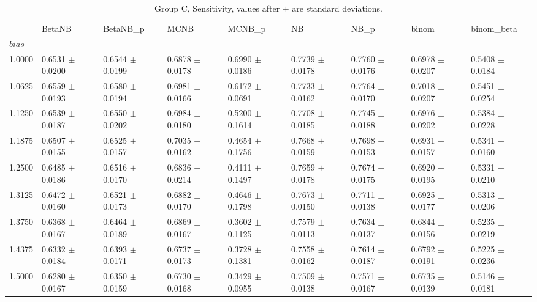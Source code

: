 \begin{table}[H]
\centering
\begin{adjustbox}{max width=\linewidth}
\begin{tabular}{lllllllll}
\toprule
 & BetaNB & BetaNB\_p & MCNB & MCNB\_p & NB & NB\_p & binom & binom\_beta \\
$bias$ &  &  &  &  &  &  &  &  \\
\midrule
1.0000 & 0.6531 $\pm$ 0.0200 & 0.6544 $\pm$ 0.0199 & 0.6878 $\pm$ 0.0178 & 0.6990 $\pm$ 0.0186 & 0.7739 $\pm$ 0.0178 & 0.7760 $\pm$ 0.0176 & 0.6978 $\pm$ 0.0207 & 0.5408 $\pm$ 0.0184 \\
1.0625 & 0.6559 $\pm$ 0.0193 & 0.6580 $\pm$ 0.0194 & 0.6981 $\pm$ 0.0166 & 0.6172 $\pm$ 0.0691 & 0.7733 $\pm$ 0.0162 & 0.7764 $\pm$ 0.0170 & 0.7018 $\pm$ 0.0207 & 0.5451 $\pm$ 0.0254 \\
1.1250 & 0.6539 $\pm$ 0.0187 & 0.6550 $\pm$ 0.0202 & 0.6984 $\pm$ 0.0180 & 0.5200 $\pm$ 0.1614 & 0.7708 $\pm$ 0.0185 & 0.7745 $\pm$ 0.0188 & 0.6976 $\pm$ 0.0202 & 0.5384 $\pm$ 0.0228 \\
1.1875 & 0.6507 $\pm$ 0.0155 & 0.6525 $\pm$ 0.0157 & 0.7035 $\pm$ 0.0162 & 0.4654 $\pm$ 0.1756 & 0.7668 $\pm$ 0.0159 & 0.7698 $\pm$ 0.0153 & 0.6931 $\pm$ 0.0157 & 0.5341 $\pm$ 0.0160 \\
1.2500 & 0.6485 $\pm$ 0.0186 & 0.6516 $\pm$ 0.0170 & 0.6836 $\pm$ 0.0214 & 0.4111 $\pm$ 0.1497 & 0.7659 $\pm$ 0.0178 & 0.7674 $\pm$ 0.0175 & 0.6920 $\pm$ 0.0195 & 0.5331 $\pm$ 0.0210 \\
1.3125 & 0.6472 $\pm$ 0.0160 & 0.6521 $\pm$ 0.0173 & 0.6882 $\pm$ 0.0170 & 0.4646 $\pm$ 0.1798 & 0.7673 $\pm$ 0.0150 & 0.7711 $\pm$ 0.0138 & 0.6925 $\pm$ 0.0177 & 0.5313 $\pm$ 0.0206 \\
1.3750 & 0.6368 $\pm$ 0.0167 & 0.6464 $\pm$ 0.0189 & 0.6869 $\pm$ 0.0167 & 0.3602 $\pm$ 0.1125 & 0.7579 $\pm$ 0.0113 & 0.7634 $\pm$ 0.0137 & 0.6844 $\pm$ 0.0156 & 0.5235 $\pm$ 0.0219 \\
1.4375 & 0.6332 $\pm$ 0.0184 & 0.6393 $\pm$ 0.0171 & 0.6737 $\pm$ 0.0173 & 0.3728 $\pm$ 0.1381 & 0.7558 $\pm$ 0.0162 & 0.7614 $\pm$ 0.0187 & 0.6792 $\pm$ 0.0191 & 0.5225 $\pm$ 0.0236 \\
1.5000 & 0.6280 $\pm$ 0.0167 & 0.6350 $\pm$ 0.0159 & 0.6730 $\pm$ 0.0168 & 0.3429 $\pm$ 0.0955 & 0.7509 $\pm$ 0.0138 & 0.7571 $\pm$ 0.0167 & 0.6735 $\pm$ 0.0139 & 0.5146 $\pm$ 0.0181 \\
\bottomrule
\end{tabular}

\end{adjustbox}
\caption{Group C, Sensitivity, values after $\pm$ are standard deviations.}
\end{table}

